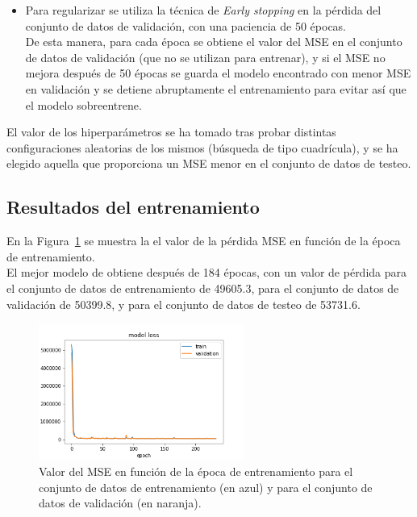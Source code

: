 \begin{itemize}
\item Para regularizar se utiliza la t\'ecnica de \textit{Early stopping} en la p\'erdida del conjunto de datos de validaci\'on, con una paciencia de 50 \'epocas. \\
De esta manera, para cada \'epoca se obtiene el valor del MSE en el conjunto de datos de validaci\'on (que no se utilizan para entrenar), y si el MSE no mejora despu\'es de 50 \'epocas se guarda el modelo encontrado con menor MSE en validaci\'on y se detiene abruptamente el entrenamiento para evitar as\'i que el modelo sobreentrene. 

\end{itemize}

El valor de los hiperpar\'ametros se ha tomado tras probar distintas configuraciones aleatorias de los mismos (b\'usqueda de tipo cuadr\'icula), y se ha elegido aquella que proporciona un MSE menor en el conjunto de datos de testeo.
  

\subsection{Resultados del entrenamiento}\label{sec:trainresults}

En la Figura~\ref{fig:model_loss} se muestra la el valor de la p\'erdida MSE en funci\'on de la \'epoca de entrenamiento. \\

El mejor modelo de obtiene despu\'es de 184 \'epocas, con un valor de p\'erdida para el conjunto de datos de entrenamiento de 49605.3, para el conjunto de datos de validaci\'on de 50399.8, y para el conjunto de datos de testeo de 53731.6.  \\

\begin{figure}[h]
\centering
\includegraphics[width=0.6\textwidth]{figures/model_loss.png}
\caption{Valor del MSE en funci\'on de la \'epoca de entrenamiento para el conjunto de datos de entrenamiento (en azul) y para el conjunto de datos de validaci\'on (en naranja).}
\label{fig:model_loss}        
\end{figure}


